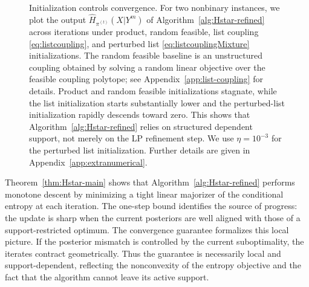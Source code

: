 \documentclass[journal]{IEEEtran}
\newcommand{\1}{\mathbf{1}}
\begin{document}
\begin{figure}[t]

\vspace{.1cm}
\caption{
Initialization controls convergence. For two nonbinary instances, we plot
 the output \(\widehat H_{\pi^{(t)}}(X| Y^m)\) of Algorithm~\ref{alg:Hstar-refined} across iterations under product, random
feasible, list coupling \eqref{eq:listcoupling}, and perturbed list \eqref{eq:listcouplingMixture} initializations. The random feasible baseline is an unstructured coupling obtained by solving a random linear objective over the feasible coupling polytope; see Appendix~\ref{app:list-coupling} for details. Product and random feasible
initializations stagnate, while the list initialization starts substantially
lower and the perturbed-list initialization rapidly descends toward zero. This shows that Algorithm~\ref{alg:Hstar-refined} relies on structured dependent support, not merely on the LP refinement step. We use $\eta=10^{-3}$ for the perturbed list initialization. Further details are given in Appendix~\ref{app:extranumerical}.}
\label{fig:initialization01}
\end{figure}

Theorem~\ref{thm:Hstar-main} shows that Algorithm~\ref{alg:Hstar-refined}
performs monotone descent by minimizing a tight linear majorizer of the
conditional entropy at each iteration. The one-step bound identifies the
source of progress: the update is sharp when the current posteriors are well
aligned with those of a support-restricted optimum. The convergence guarantee
formalizes this local picture. If the posterior mismatch is controlled by the
current suboptimality, the iterates contract geometrically. Thus the guarantee
is necessarily local and support-dependent, reflecting the nonconvexity of the
entropy objective and the fact that the algorithm cannot leave its active
support.
\end{document}
